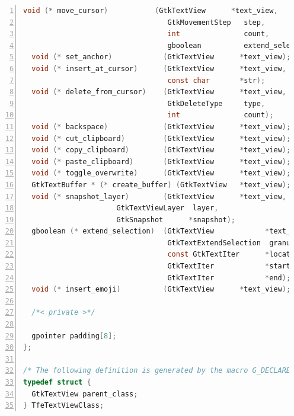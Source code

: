 \begin{lstlisting}[language=C, numbers=left]
  void (* move_cursor)           (GtkTextView      *text_view,
                                  GtkMovementStep   step,
                                  int               count,
                                  gboolean          extend_selection);
  void (* set_anchor)            (GtkTextView      *text_view);
  void (* insert_at_cursor)      (GtkTextView      *text_view,
                                  const char       *str);
  void (* delete_from_cursor)    (GtkTextView      *text_view,
                                  GtkDeleteType     type,
                                  int               count);
  void (* backspace)             (GtkTextView      *text_view);
  void (* cut_clipboard)         (GtkTextView      *text_view);
  void (* copy_clipboard)        (GtkTextView      *text_view);
  void (* paste_clipboard)       (GtkTextView      *text_view);
  void (* toggle_overwrite)      (GtkTextView      *text_view);
  GtkTextBuffer * (* create_buffer) (GtkTextView   *text_view);
  void (* snapshot_layer)        (GtkTextView      *text_view,
                      GtkTextViewLayer  layer,
                      GtkSnapshot      *snapshot);
  gboolean (* extend_selection)  (GtkTextView            *text_view,
                                  GtkTextExtendSelection  granularity,
                                  const GtkTextIter      *location,
                                  GtkTextIter            *start,
                                  GtkTextIter            *end);
  void (* insert_emoji)          (GtkTextView      *text_view);

  /*< private >*/

  gpointer padding[8];
};

/* The following definition is generated by the macro G_DECLARE_FINAL_TYPE */
typedef struct {
  GtkTextView parent_class;
} TfeTextViewClass;
\end{lstlisting}

